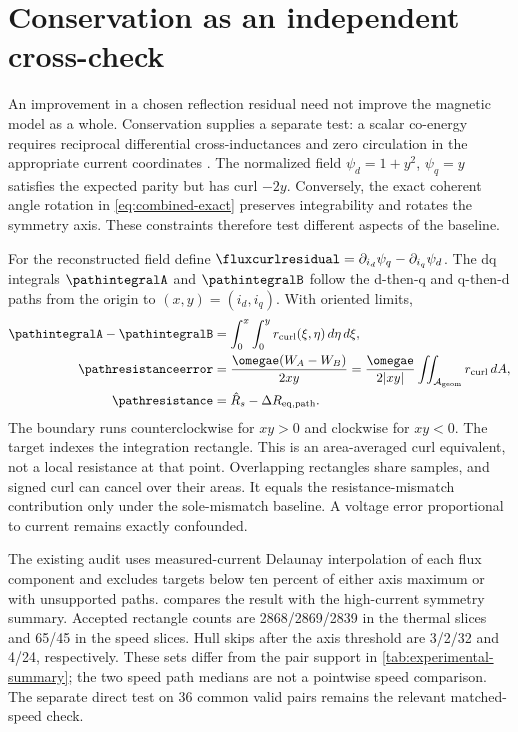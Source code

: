 \section{Conservation as an independent cross-check}
\label{sec:conservation-cross-check}
An improvement in a chosen reflection residual need not improve the magnetic
model as a whole. Conservation supplies a separate test: a scalar co-energy
requires reciprocal differential cross-inductances and zero circulation in
the appropriate current coordinates \cite{haus1989,jebai2014}.
The normalized field $\psi_d=1+y^2$, $\psi_q=y$ satisfies the expected
parity but has curl $-2y$. Conversely, the exact coherent angle rotation in
\cref{eq:combined-exact} preserves integrability and rotates the symmetry
axis. These constraints therefore test different aspects of the baseline.

For the reconstructed field define
$\fluxcurlresidual=\partial_{i_d}\psi_q-\partial_{i_q}\psi_d$.
The dq integrals $\pathintegralA$ and $\pathintegralB$ follow the d-then-q
and q-then-d paths from the origin to $(x,y)=(i_d,i_q)$. With oriented limits,
\begin{align}
 \pathintegralA-\pathintegralB
 &=\int_0^x\int_0^y r_{\rm curl}(\xi,\eta)\,d\eta\,d\xi,\\
 \pathresistanceerror
 &=\frac{\omegae(W_A-W_B)}{2xy}
 =\frac{\omegae}{2|xy|}\iint_{\mathcal A_{\rm geom}}r_{\rm curl}\,dA,
 \label{eq:diagnostic-path-equivalent}\\
 \pathresistance&=\hat R_s-\Delta R_{\rm eq,path}.
\end{align}
The boundary runs counterclockwise for $xy>0$ and clockwise for $xy<0$.
The target indexes the integration rectangle. This is an area-averaged curl
equivalent, not a local resistance at that point. Overlapping rectangles
share samples, and signed curl can cancel over their areas.
It equals the resistance-mismatch contribution only under the sole-mismatch
baseline. A voltage error proportional to current remains exactly confounded.

The existing audit uses measured-current Delaunay interpolation of each flux
component and excludes targets below ten percent of either axis maximum or
with unsupported paths.  compares the
result with the high-current symmetry summary. Accepted rectangle counts are
2868/2869/2839 in the thermal slices and 65/45 in the speed slices. Hull skips
after the axis threshold are 3/2/32 and 4/24, respectively. These sets differ
from the pair support in \cref{tab:experimental-summary}; the two speed path
medians are not a pointwise speed comparison. The separate direct test on
36 common valid pairs remains the relevant matched-speed check.
\begin{table}[tb]
\centering\small

\caption{Conservation cross-check on unchanged audit support. All resistance
columns are m$\Omega$; $n$ is rpm and rotor reference is $^\circ$C.
Symmetry uses the high-current subset; the path columns are median/raw MAD
over $N_{\rm rect}$ rectangles. P1 exact means exact integration of the same
interpolator, not exact physical identification.}
\label{tab:diagnostic-path-comparison}
\end{table}

